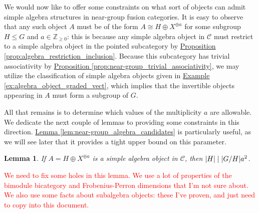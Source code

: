 \documentclass[12pt, reqno]{amsart}
\numberwithin{equation}{section}
\theoremstyle{plainspace}
\newtheorem{lemma}[theorem]{Lemma}
\theoremstyle{definitionspace}
\theoremstyle{remarkspace}
\DeclarePairedDelimiter{\abs}{\lvert}{\rvert}
\newcommand{\mathcat}[1]{\mathcal{#1}}
\begin{document}
\noindent We would now like to offer some constraints on what sort of objects can admit simple algebra structures in near-group fusion categories. It is easy to observe that any such object $A$ must be of the form $A \cong H \oplus X^{\oplus a}$ for some subgroup $H \leq G$ and $a \in \mathbb{Z}_{\geq 0}$: this is because any simple algebra object in $\mathcat{C}$ must restrict to a simple algebra object in the pointed subcategory by \hyperref[prop:algebra_restriction_inclusion]{Proposition \ref*{prop:algebra_restriction_inclusion}}. Because this subcategory has trivial associativity by \hyperref[prop:near-group_trivial_associativity]{Proposition \ref*{prop:near-group_trivial_associativity}}, we may utilize the classification of simple algebra objects given in \hyperref[ex:algebra_object_graded_vect]{Example \ref*{ex:algebra_object_graded_vect}}, which implies that the invertible objects appearing in $A$ must form a subgroup of $G$.
\newline

\noindent All that remains is to determine which values of the multiplicity $a$ are allowable. We dedicate the next couple of lemmas to providing some constraints in this direction. \hyperref[lem:near-group_algebra_candidates]{Lemma \ref*{lem:near-group_algebra_candidates}} is particularly useful, as we will see later that it provides a tight upper bound on this parameter.
\newline

\begin{lemma}\label{lem:near-group_algebra_algebraic_integer}
If $A = H \oplus X^{\oplus a}$ is a simple algebra object in $\mathcat{C}$, then $\abs{H} \mid \abs{G/H}a^2$.
\end{lemma}
\leavevmode

\noindent \textcolor{red}{We need to fix some holes in this lemma. We use a lot of properties of the bimodule bicategory and Frobenius-Perron dimensions that I'm not sure about. We also use some facts about subalgebra objects: these I've proven, and just need to copy into this document.}
\newline
\end{document}
